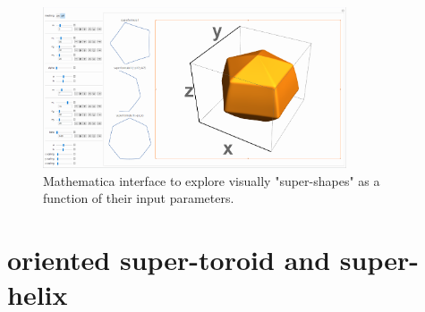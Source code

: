 \begin{figure}[htb]
{\begin{verbatim}
\end{verbatim}
}
\begin{center}
\includegraphics[width=0.8\textwidth]{../images/form_factor/supershapes/MathematicaSphericalProductSuperShapes.png}
\end{center}
\caption{Mathematica interface to explore visually "super-shapes" as a function of their input parameters.}
\label{fig:MathematicaSphericalProductSuperShapes}
\end{figure}



\section{oriented super-toroid and super-helix}\label{sect:super_toroid_helix}

